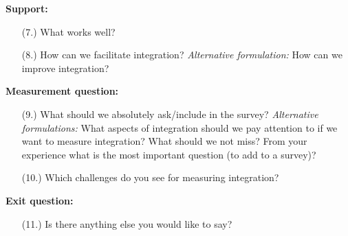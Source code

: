 \documentclass[man, 12pt, a4paper]{apa7}
\begin{document}
{\textbf{Support:}
\begin{enumerate}[noitemsep,topsep=0pt]
    \item [(7.)] What works well?
    \item [(8.)] How can we facilitate integration?\newline
    \textit{Alternative formulation:} How can we improve integration?
\end{enumerate}

\textbf{Measurement question:}
\begin{enumerate}[noitemsep,topsep=0pt]
    \item [(9.)] What should we absolutely ask/include in the survey?\newline
    \textit{Alternative formulations:} What aspects of integration should we pay attention to if we want to measure integration? What should we not miss? From your experience what is the most important question (to add to a survey)?
    \item [(10.)] Which challenges do you see for measuring integration?
\end{enumerate}

\textbf{Exit question:} 
\begin{enumerate}[noitemsep,topsep=0pt]
    \item [(11.)] Is there anything else you would like to say?
\end{enumerate}

}
\end{document}
